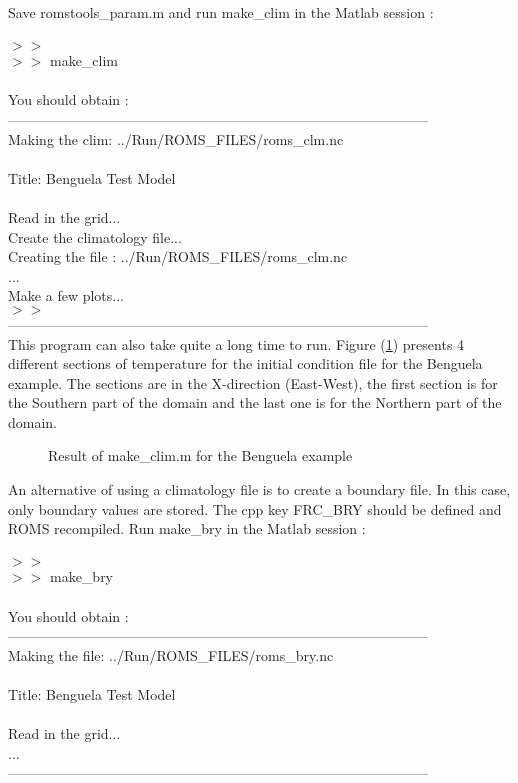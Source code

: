 Save romstools\_param.m and run make\_clim in the Matlab session :
\\ \\
$>>$\\
$>>$ make\_clim \\\\
You should obtain :\\
------------------------------------------------------------------------------------------\\
 Making the clim: ../Run/ROMS\_FILES/roms\_clm.nc \\
 \\
 Title: Benguela Test Model \\
 \\
 Read in the grid...
 \\
 Create the climatology file... \\
 Creating the file : ../Run/ROMS\_FILES/roms\_clm.nc\\
 ...\\ 
 Make a few plots...\\ 
 $>>$\\
------------------------------------------------------------------------------------------\\
This program can also take quite a long time to run.
Figure (\ref{fig:clim}) presents 4 different sections
of temperature for the initial condition file for the 
Benguela example. The sections are in the X-direction (East-West), 
the first section is for the Southern part of the domain and the last one 
is for the Northern part of the domain.
\begin{figure}[h!]
\centerline{}
\caption{Result of make\_clim.m for the Benguela example}
\label{fig:clim}
\end{figure}

An alternative of using a climatology file is to create a boundary 
file. In this case, only boundary values are stored. The cpp key
FRC\_BRY should be defined and ROMS recompiled. Run make\_bry in 
the Matlab session :
\\ \\
$>>$\\
$>>$ make\_bry \\\\
You should obtain :\\
------------------------------------------------------------------------------------------\\
 Making the file: ../Run/ROMS\_FILES/roms\_bry.nc \\
 \\
 Title: Benguela Test Model \\
 \\
 Read in the grid... \\
... \\
------------------------------------------------------------------------------------------\\

